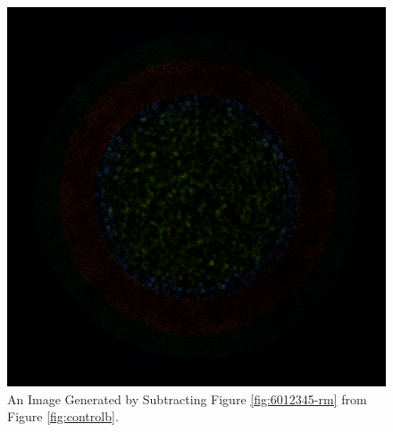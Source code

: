 \begin{figure}[H]
\centering
\includegraphics[width=0.6\linewidth]{figures/shuffle/diff-6012345}
\caption{An Image Generated by Subtracting Figure \ref{fig:6012345-rm} from Figure \ref{fig:controlb}.}
\label{fig:diff-6012345}
\end{figure}